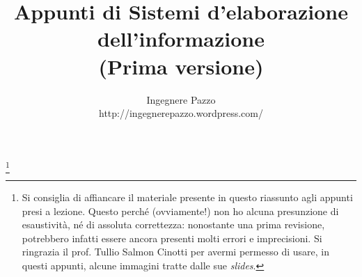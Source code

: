 \documentclass[a4paper]{book}
\author{Ingegnere Pazzo \\ http://ingegnerepazzo.wordpress.com/}
\title{Appunti di Sistemi d'elaborazione dell'informazione \\ (Prima versione)}
\begin{document}
\maketitle
\thanks{Si consiglia di affiancare il materiale presente in questo riassunto agli appunti presi a lezione. Questo perché (ovviamente!) non ho alcuna presunzione di esaustività, né di assoluta correttezza: nonostante una prima revisione, potrebbero infatti essere ancora presenti molti errori e imprecisioni. Si ringrazia il prof. Tullio Salmon Cinotti per avermi permesso di usare, in questi appunti, alcune immagini tratte dalle sue \textit{slides}.}
\tableofcontents











\listoffigures
\end{document}
